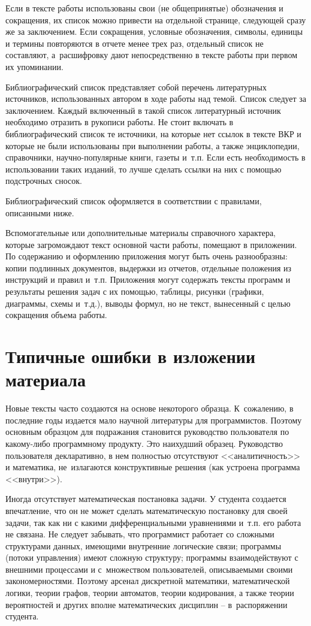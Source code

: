 \documentclass[PI,VKR]{HSEUniversity}
\begin{document}
Если в тексте работы использованы свои (не общепринятые) обозначения и сокращения, их список можно привести на отдельной странице, следующей сразу же за заключением. Если сокращения, условные обозначения, символы, единицы и термины повторяются в отчете менее трех раз, отдельный список не составляют, а расшифровку дают непосредственно в тексте работы при первом их упоминании.

Библиографический список представляет собой перечень литературных источников, использованных автором в ходе работы над темой. Список следует за заключением.
Каждый включенный в такой список литературный источник необходимо отразить в рукописи работы. Не стоит включать в библиографический список те источники, на которые нет ссылок в тексте ВКР и которые не были использованы при выполнении работы, а также энциклопедии, справочники, научно-популярные книги, газеты и т.п. Если есть необходимость в использовании таких изданий, то лучше сделать ссылки на них с помощью подстрочных сносок.

Библиографический список оформляется в соответствии с правилами, описанными ниже.

Вспомогательные или дополнительные материалы справочного характера, которые загромождают текст основной части работы, помещают в приложении.
По содержанию и оформлению приложения могут быть очень разнообразны: копии подлинных документов, выдержки из отчетов, отдельные положения из инструкций и правил и т.п. Приложения могут содержать тексты программ и результаты решения задач с их помощью, таблицы, рисунки (графики, диаграммы, схемы и т.д.), выводы формул, но не текст, вынесенный с целью сокращения объема работы.

\section{Типичные ошибки в изложении материала}

Новые тексты часто создаются на основе некоторого образца. К сожалению, в последние годы издается мало научной литературы для программистов. Поэтому основным образцом для подражания становится руководство пользователя по какому-либо программному продукту. Это наихудший образец. Руководство пользователя декларативно, в нем полностью отсутствуют <<аналитичность>> и математика, не излагаются конструктивные решения (как устроена программа <<внутри>>).

Иногда отсутствует математическая постановка задачи. У студента создается впечатление, что он не может сделать математическую постановку для своей задачи, так как ни с какими дифференциальными уравнениями и т.п. его работа не связана. Не следует забывать, что программист работает со сложными структурами данных, имеющими внутренние логические связи; программы (потоки управления) имеют сложную структуру; программы взаимодействуют с внешними процессами и с множеством пользователей, описываемыми своими закономерностями. Поэтому арсенал дискретной математики, математической логики, теории графов, теории автоматов, теории кодирования, а также теории вероятностей и других вполне математических дисциплин – в распоряжении студента.
\end{document}
